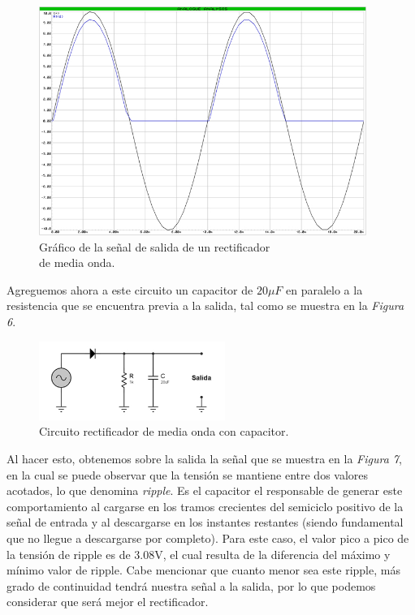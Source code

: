 \documentclass{article}
\begin{document}
\newpage
\begin{figure}[h]
	\centering
	\includegraphics[width=0.95\textwidth]{images/4-4-2-grafico-circuito-rectificador-media-onda.jpg}
	\medskip
	\caption{Gráfico de la señal de salida de un rectificador\\ de media onda.}
\end{figure}
\bigskip\bigskip

	
	Agreguemos ahora a este circuito un capacitor de $20\mu F$ en paralelo a la resistencia que se encuentra previa a la salida, tal como se muestra en la \textit{Figura 6}.
\bigskip


\begin{figure}[h]
	\centering
	\includegraphics[width=0.54\textwidth]{images/4-4-3-circuito-rectificador-media-onda-con-filtro.jpg}
	\medskip
	\caption{Circuito rectificador de media onda con capacitor.}
\end{figure}
\bigskip\bigskip


	Al hacer esto, obtenemos sobre la salida la señal que se muestra en la \textit{Figura 7}, en la cual se puede observar que la tensión se mantiene entre dos valores acotados, lo que denomina \textit{ripple}. Es el capacitor el responsable de generar este comportamiento al cargarse en los tramos crecientes del semiciclo positivo de la señal de entrada y al descargarse en los instantes restantes (siendo fundamental que no llegue a descargarse por completo). Para este caso, el valor pico a pico de la tensión de ripple es de 3.08V, el cual resulta de la diferencia del máximo y mínimo valor de ripple. Cabe mencionar que cuanto menor sea este ripple, más grado de continuidad tendrá nuestra señal a la salida, por lo que podemos considerar que será mejor el rectificador.
\bigskip
\end{document}
